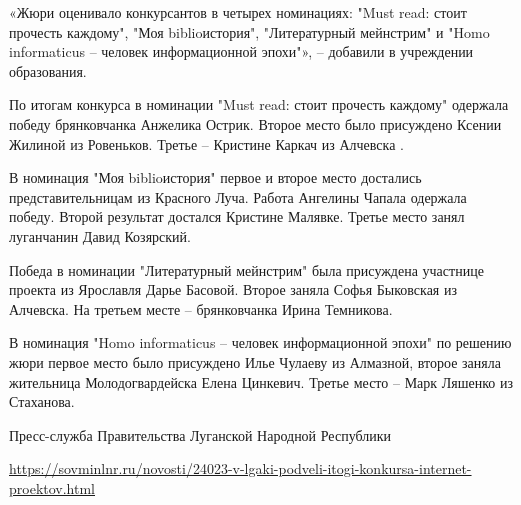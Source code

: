 «Жюри оценивало конкурсантов в четырех номинациях: "Must read: стоит прочесть
каждому", "Моя biblioистория", "Литературный мейнстрим" и "Homo informaticus –
человек информационной эпохи"», – добавили в учреждении образования.

По итогам конкурса в номинации "Must read: стоит прочесть каждому" одержала
победу брянковчанка Анжелика Острик. Второе место было присуждено Ксении
Жилиной из Ровеньков. Третье – Кристине Каркач из Алчевска .

В номинация "Моя biblioистория" первое и второе место достались
представительницам из Красного Луча. Работа Ангелины Чапала одержала победу.
Второй результат достался Кристине Малявке. Третье место занял луганчанин Давид
Козярский.

Победа в номинации "Литературный мейнстрим" была присуждена участнице проекта
из Ярославля Дарье Басовой. Второе заняла Софья Быковская из Алчевска. На
третьем месте – брянковчанка Ирина Темникова.

В номинация "Homo informaticus – человек информационной эпохи" по решению жюри
первое место было присуждено Илье Чулаеву из Алмазной, второе заняла жительница
Молодогвардейска Елена Цинкевич. Третье место – Марк Ляшенко из Стаханова.

Пресс-служба Правительства Луганской Народной Республики

\url{https://sovminlnr.ru/novosti/24023-v-lgaki-podveli-itogi-konkursa-internet-proektov.html}
